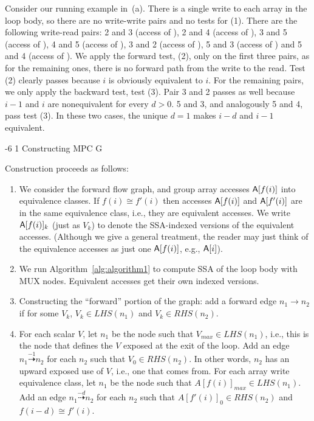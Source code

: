 \documentclass[sigconf, screen, natbib=false, dvipsnames, table]{acmart}
\makeatletter
\renewcommand{\subsubsection}{\@startsection{subsubsection}{3}{\z@}%
                        {-6\p@ \@plus -4\p@ \@minus -4\p@}%
                        {1\p@ \@plus 1\p@ \@minus 0\p@}%
                        {\normalfont\normalsize\bfseries\boldmath}}
\theoremstyle{definition}
\makeatother
\begin{document}
Consider our running example in~(a). There is a single write to each array in the loop body, 
so there are no write-write pairs and no tests for (1). There are the following write-read pairs: 2 and 3 (access of \A), 
2 and 4 (access of \A), 3 and 5 (access of \B), 4 and 5 (access of \C), 3 and 2 (access of \B), 5 and 3 (access of \D) and 5 and 4 (access of \D).
We apply the forward test, (2), only on the first three pairs, as for the remaining ones, there is no forward path from the write to the read. 
Test (2) clearly passes because $i$ is obviously equivalent to $i$. For the remaining pairs, we only apply the backward test, test (3). 
Pair 3 and 2 passes as well because $i-1$ and $i$ are nonequivalent for every $d > 0$. 5 and 3, and analogously 5 and 4, pass test (3). 
In these two cases, the unique $d = 1$ makes $i - d$ and $i-1$ equivalent. 


\subsubsection{Constructing MPC G}

Construction proceeds as follows: 

\begin{enumerate}

\item We consider the forward flow graph, and group array accesses ${\sf A}[f(i)]$ into equivalence classes. If $f(i) \cong f'(i)$
then accesses ${\sf A}[f(i)]$ and ${\sf A}[f'(i)]$ are in the same equivalence class, i.e., they are equivalent accesses. We write ${\sf A}[f(i)]_k$ 
(just as $V_k$) to denote the SSA-indexed versions of the equivalent accesses. (Although we give a general treatment, the reader 
may just think of the equivalence accesses as just one ${\sf A}[f(i)]$, e.g., ${\sf A}[i]$). 

\item We run Algorithm~\ref{alg:algorithm1} to compute SSA of the loop body with MUX nodes. Equivalent accesses get their own indexed versions.

\item Constructing the ``forward'' portion of the graph: add a forward edge $n_1 \rightarrow n_2$ if for some $V_k$, 
$V_k \in LHS(n_1)$ and $V_k \in RHS(n_2)$.  

\item For each scalar $V$, let $n_1$ be the node such that $V_\mathit{max} \in LHS(n_1)$, 
i.e., this is the node that defines the $V$ exposed at the exit of the loop. Add an edge $n_1 \stackrel{-1}{\dasharrow} n_2$ 
for each $n_2$ such that $V_0 \in RHS(n_2)$. In other words, $n_2$ has an upward exposed use of $V$, i.e., one that comes
from. For each array write equivalence class, let $n_1$ be the node such that $A[f(i)]_\mathit{max} \in LHS(n_1)$. Add an edge 
$n_1 \stackrel{-d}{\dasharrow} n_2$ for each $n_2$ such that $A[f'(i)]_0 \in RHS(n_2)$ and $f(i-d) \cong f'(i)$.

\end{enumerate}
\end{document}
